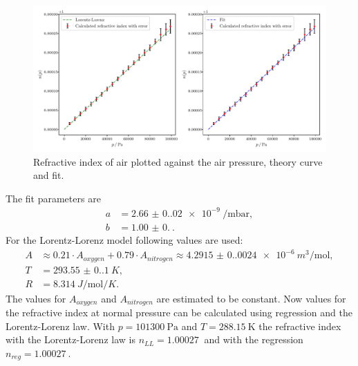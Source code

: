 \begin{figure}[H]
  \centering
  \includegraphics[width=\textwidth]{build/air_and_lorentz.pdf}
  \caption{Refractive index of air plotted against the air pressure, theory curve and fit.}
  \label{fig:air}
\end{figure}

The fit parameters are
\begin{align*}
  a &= \SI{2.66(0.02)e-9}{\per\milli\bar}, \\
  b &= \SI{1.00(0.00)}{}.
\end{align*}
For the Lorentz-Lorenz model following values are used:
\begin{align*}
  A &\approx {0.21\cdot A_{oxygen}+0.79\cdot A_{nitrogen}} \approx \SI{4.2915(0.0024)e-6}{m^3\per\mol},\\
  T &= \SI{293.55(0.1)}{K},\\
  R &= \SI{8.314}{J\per\mol\per K}.
\end{align*}
The values for $A_{oxygen}$\cite{A_oxy} and $A_{nitrogen}$\cite{A_nit} are estimated to be constant.
Now values for the refractive index at normal pressure can be calculated using regression and the Lorentz-Lorenz law.
With $p = \SI{101300}{\pascal}$ and $T = \SI{288.15}{\kelvin}$ the refractive index with the
Lorentz-Lorenz law is $n_{LL} = \SI{1.00027}{}$ and with the regression $n_{reg} = \SI{1.00027}{}$.
\newpage